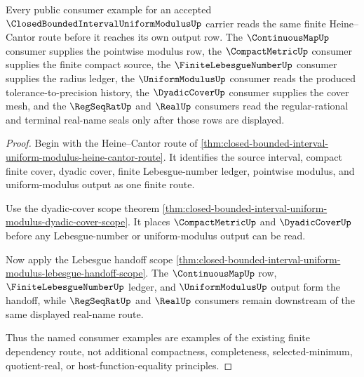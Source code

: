 \begin{theorem}
\label{thm:closed-bounded-interval-uniform-modulus-consumer-examples}
Every public consumer example for an accepted $\ClosedBoundedIntervalUniformModulusUp$ carrier reads the same finite Heine--Cantor route before it reaches its own output row. The $\ContinuousMapUp$ consumer supplies the pointwise modulus row, the $\CompactMetricUp$ consumer supplies the finite compact source, the $\FiniteLebesgueNumberUp$ consumer supplies the radius ledger, the $\UniformModulusUp$ consumer reads the produced tolerance-to-precision history, the $\DyadicCoverUp$ consumer supplies the cover mesh, and the $\RegSeqRatUp$ and $\RealUp$ consumers read the regular-rational and terminal real-name seals only after those rows are displayed.
\end{theorem}
\begin{proof}
Begin with the Heine--Cantor route of \autoref{thm:closed-bounded-interval-uniform-modulus-heine-cantor-route}. It identifies the source interval, compact finite cover, dyadic cover, finite Lebesgue-number ledger, pointwise modulus, and uniform-modulus output as one finite route.

Use the dyadic-cover scope theorem \autoref{thm:closed-bounded-interval-uniform-modulus-dyadic-cover-scope}. It places $\CompactMetricUp$ and $\DyadicCoverUp$ before any Lebesgue-number or uniform-modulus output can be read.

Now apply the Lebesgue handoff scope \autoref{thm:closed-bounded-interval-uniform-modulus-lebesgue-handoff-scope}. The $\ContinuousMapUp$ row, $\FiniteLebesgueNumberUp$ ledger, and $\UniformModulusUp$ output form the handoff, while $\RegSeqRatUp$ and $\RealUp$ consumers remain downstream of the same displayed real-name route.

Thus the named consumer examples are examples of the existing finite dependency route, not additional compactness, completeness, selected-minimum, quotient-real, or host-function-equality principles.
\end{proof}


